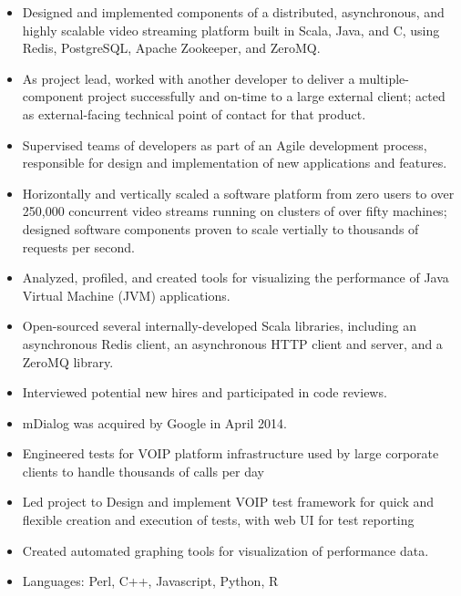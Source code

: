 \documentclass[11pt,a4paper,sans]{moderncv}
\begin{document}
{ \begin{itemize} \itemsep -1pt
  \item Designed and implemented components of a distributed, asynchronous, and highly scalable video streaming platform built in Scala, Java, and C, using Redis, PostgreSQL, Apache Zookeeper, and ZeroMQ.
  \item As project lead, worked with another developer to deliver a multiple-component project successfully and on-time to a large external client; acted as external-facing technical point of contact for that product.
  \item Supervised teams of developers as part of an Agile development process, responsible for design and implementation of new applications and features.
  \item Horizontally and vertically scaled a software platform from zero users to over 250,000 concurrent video streams running on clusters of over fifty machines; designed software components proven to scale vertially to thousands of requests per second.
  \item Analyzed, profiled, and created tools for visualizing the performance of Java Virtual Machine (JVM) applications.
  \item Open-sourced several internally-developed Scala libraries, including an asynchronous Redis client, an asynchronous HTTP client and server, and a ZeroMQ library.
  \item Interviewed potential new hires and participated in code reviews.
  \item mDialog was acquired by Google in April 2014.
\end{itemize} }
  
{ \begin{itemize} \itemsep -1pt
  \item Engineered tests for VOIP platform infrastructure used by large corporate clients to handle thousands of calls per day\item Led project to Design and implement VOIP test framework for quick and flexible creation and execution of tests, with web UI for test reporting\item Created automated graphing tools for visualization of performance data.\item Languages: Perl, C++, Javascript, Python, R
\end{itemize} }
  
\end{document}
